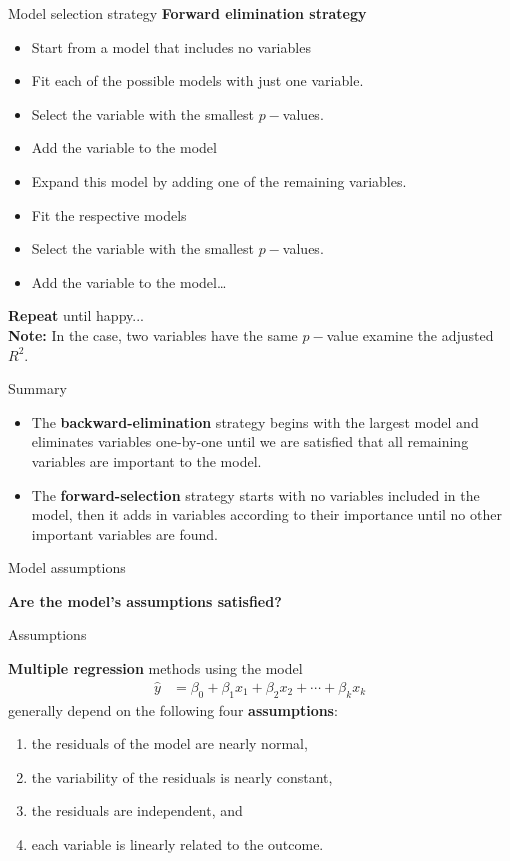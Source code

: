 \documentclass[12pt,a4paper]{beamer}
\begin{document}
			\begin{frame}{Model selection strategy}
				\textbf{Forward elimination strategy}
				\begin{itemize}
					\item Start from a  model that includes no variables
					\item Fit each of the possible models with just one variable.
					\item Select the variable with the smallest $p-$values.
					\item Add the variable to the model
					\item Expand this model by adding one of the remaining variables.
					\item Fit the respective models
					\item Select the variable with the smallest $p-$values.
					\item Add the variable to the model\dots
				\end{itemize}
				\textbf{Repeat} until happy...\\
				\textbf{Note:} In the case, two variables have the same $p-$value examine the adjusted $R^2.$
			\end{frame}
			\begin{frame}{Summary}
				\begin{itemize}
					\item The \textbf{backward-elimination} strategy begins with the largest model and eliminates variables one-by-one until we are satisfied that all remaining variables are important to the model. 
					
\item The \textbf{forward-selection} strategy starts with no variables included in the model, then it adds in variables according to their importance until no other important variables are found.
\end{itemize}
			\end{frame}
			\begin{frame}{Model assumptions}
				\begin{center}
			\textbf{Are the model's assumptions satisfied?}
			\end{center}
			\end{frame}
			\begin{frame}{Assumptions}
				
				\textbf{Multiple regression} methods using the model
				\begin{align*}
				\hat{y} &= \beta_0 + \beta_1x_1 + \beta_2x_2 + \cdots + \beta_kx_k
				\end{align*}
				generally depend on the following four \textbf{assumptions}:
				\begin{enumerate}
				\setlength{\itemsep}{0mm}
				\item the residuals of the model are nearly normal,
				\item the variability of the residuals is nearly constant,
				\item the residuals are independent, and
				\item each variable is linearly related to the outcome.
				\end{enumerate}
			\end{frame}
\end{document}
